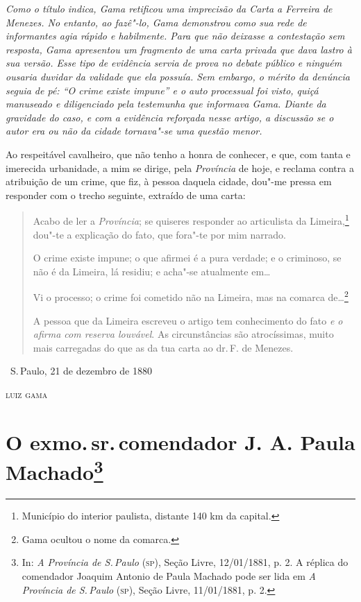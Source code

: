 \begin{flushleft}
{\footnotesize\itshape
Como o título indica, Gama retificou uma imprecisão da Carta a
Ferreira de Menezes. No entanto, ao fazê"-lo, Gama demonstrou como sua
rede de informantes agia rápido e habilmente. Para que não deixasse a
contestação sem resposta, Gama apresentou um fragmento de uma carta
privada que dava lastro à sua versão. Esse tipo de evidência servia de
prova no debate público e ninguém ousaria duvidar da validade que ela
possuía. Sem embargo, o mérito da denúncia seguia de pé: ``O crime existe
impune'' e o auto processual foi visto, quiçá manuseado e diligenciado
pela testemunha que informava Gama. Diante da gravidade do caso, e com a
evidência reforçada nesse artigo, a discussão se o autor era ou não da
cidade tornava"-se uma questão menor. }
\end{flushleft}

Ao respeitável cavalheiro, que não tenho a honra de conhecer, e que, com
tanta e imerecida urbanidade, a mim se dirige, pela \emph{Província} de
hoje, e reclama contra a atribuição de um crime, que fiz, à pessoa
daquela cidade, dou"-me pressa em responder com o trecho seguinte,
extraído de uma carta:

\noindent\dotfill{}

\begin{quote}
Acabo de ler a \emph{Província}; se quiseres responder ao articulista
da Limeira,\footnote{Município do interior paulista, distante 140 km da
  capital.} dou"-te a explicação do fato, que fora"-te por mim narrado.

O crime existe impune; o que afirmei é a pura verdade; e o criminoso, se
não é da Limeira, lá residiu; e acha"-se atualmente em\ldots{}

Vi o processo; o crime foi cometido não na Limeira, mas na comarca
de\ldots{}\footnote{Gama ocultou o nome da comarca.}

A pessoa que da Limeira
escreveu o artigo tem conhecimento do fato \emph{e o afirma com reserva
louvável}. As circunstâncias são atrocíssimas, muito mais carregadas do
que as da tua carta ao dr.\,F. de Menezes.
\end{quote}

\dotfill{}

\hfill\ S.\,Paulo, 21 de dezembro de 1880\smallskip

\hfill\textsc{luiz gama}


\chapter{O exmo.\,sr.\,comendador J. A. Paula Machado\footnote[*]{In:
  \emph{A Província de S.\,Paulo} (\textsc{sp}), Seção Livre, 12/01/1881, p. 2. A
  réplica do comendador Joaquim Antonio de Paula Machado pode ser lida
  em \emph{A Província de S.\,Paulo} (\textsc{sp}), Seção Livre, 11/01/1881, p. 2.}}

